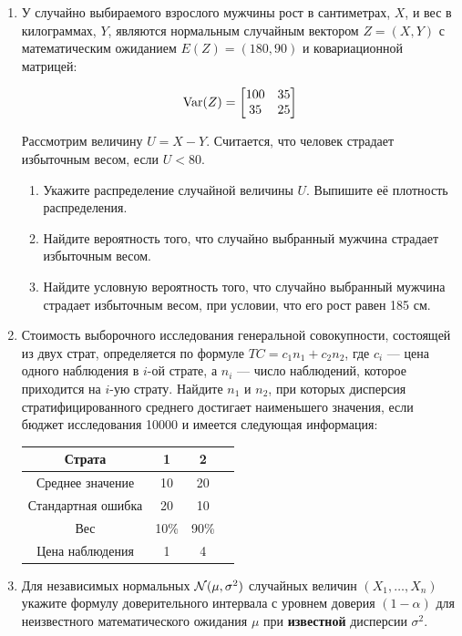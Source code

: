 \begin{enumerate}
\item У случайно выбираемого взрослого мужчины рост в сантиметрах, $X$, и вес
в килограммах, $Y$,
являются нормальным случайным вектором $Z=(X,Y)$ с математическим ожиданием $E(Z)=(180,90)$ и ковариационной матрицей:

\[
\operatorname{Var}(Z)=\begin{bmatrix}100 & 35\\35 & 25\end{bmatrix}
\]

Рассмотрим величину $U=X-Y$. Считается, что человек страдает избыточным весом, если $U<80$.
\begin{enumerate}
\item Укажите распределение случайной величины $U$. Выпишите её плотность распределения.
\item Найдите вероятность того, что случайно выбранный мужчина страдает избыточным весом.
\item Найдите условную вероятность того, что случайно выбранный мужчина страдает избыточным весом, при условии, что его рост равен 185 см.
\end{enumerate}
\item Стоимость выборочного исследования генеральной совокупности, состоящей из двух страт, определяется по формуле $TC=c_{1}n_{1}+c_{2}n_{2}$, где $c_{i}$ — цена одного наблюдения в $i$-ой страте, а $n_{i}$ — число наблюдений, которое приходится на $i$-ую страту. Найдите $n_{1}$ и $n_{2}$, при которых дисперсия стратифицированного среднего достигает наименьшего значения, если бюджет исследования 10000 и имеется следующая информация:

			\begin{tabular}{c|c|c|c}
			Страта & 1 & 2 \\
			\hline
			Среднее значение & 10 & 20  \\ \hline
			Стандартная ошибка & 20 & 10  \\ \hline
			Вес & 10\% & 90\% \\
			\hline
			Цена наблюдения & 1 & 4 \\
			\end{tabular}

\item Для независимых нормальных $\mathcal{N}(\mu,\sigma^2)$ случайных величин $(X_{1}, \ldots, X_{n})$ укажите формулу доверительного интервала с уровнем доверия $(1-\alpha)$ для неизвестного математического ожидания $\mu$ при \textbf{известной} дисперсии $\sigma^2$.


\end{enumerate}
